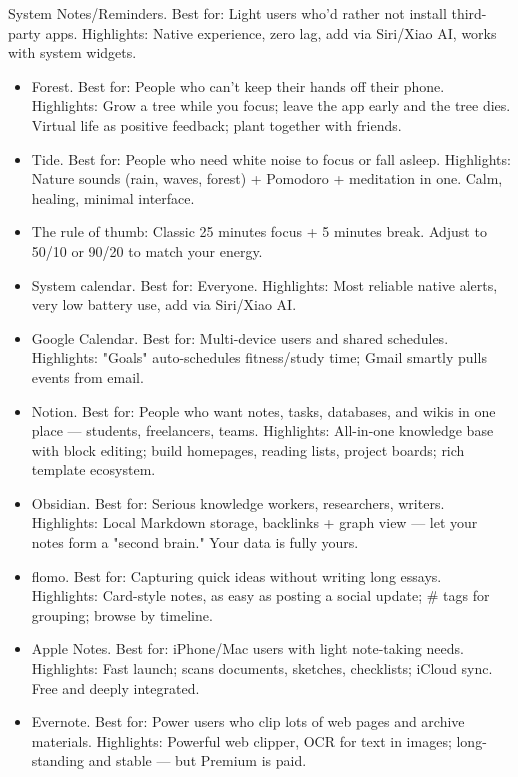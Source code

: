 System Notes/Reminders. Best for: Light users who'd rather not install third-party apps. Highlights: Native experience, zero lag, add via Siri/Xiao AI, works with system widgets.


\begin{itemize}
  \item Forest. Best for: People who can't keep their hands off their phone. Highlights: Grow a tree while you focus; leave the app early and the tree dies. Virtual life as positive feedback; plant together with friends.
  \item Tide. Best for: People who need white noise to focus or fall asleep. Highlights: Nature sounds (rain, waves, forest) + Pomodoro + meditation in one. Calm, healing, minimal interface.
  \item The rule of thumb: Classic 25 minutes focus + 5 minutes break. Adjust to 50/10 or 90/20 to match your energy.
\end{itemize}


\begin{itemize}
  \item System calendar. Best for: Everyone. Highlights: Most reliable native alerts, very low battery use, add via Siri/Xiao AI.
  \item Google Calendar. Best for: Multi-device users and shared schedules. Highlights: "Goals" auto-schedules fitness/study time; Gmail smartly pulls events from email.
\end{itemize}


\begin{itemize}
  \item Notion. Best for: People who want notes, tasks, databases, and wikis in one place — students, freelancers, teams. Highlights: All-in-one knowledge base with block editing; build homepages, reading lists, project boards; rich template ecosystem.
  \item Obsidian. Best for: Serious knowledge workers, researchers, writers. Highlights: Local Markdown storage, backlinks + graph view — let your notes form a "second brain." Your data is fully yours.
  \item flomo. Best for: Capturing quick ideas without writing long essays. Highlights: Card-style notes, as easy as posting a social update; \# tags for grouping; browse by timeline.
  \item Apple Notes. Best for: iPhone/Mac users with light note-taking needs. Highlights: Fast launch; scans documents, sketches, checklists; iCloud sync. Free and deeply integrated.
  \item Evernote. Best for: Power users who clip lots of web pages and archive materials. Highlights: Powerful web clipper, OCR for text in images; long-standing and stable — but Premium is paid.
\end{itemize}

